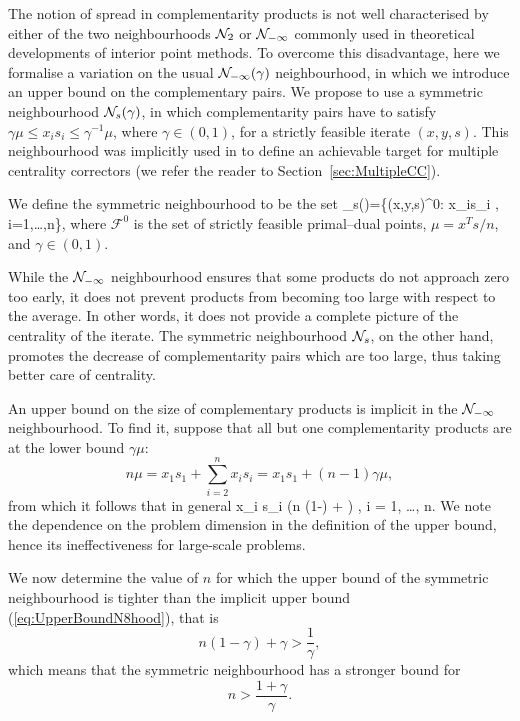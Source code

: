 The notion of spread in complementarity products
is not well characterised by either 
of the two neighbourhoods $\mathcal{N}_2$ or $\mathcal{N}_{-\infty}$ commonly used 
in theoretical developments of interior point methods.
To overcome this disadvantage, here we formalise a variation 
on the usual $\mathcal{N}_{-\infty}(\gamma)$ neighbourhood, 
in which we introduce an upper bound on the complementary pairs. 
We propose to use a symmetric neighbourhood $\mathcal{N}_s(\gamma)$,
in which complementarity pairs have to satisfy 
$\gamma \mu \leq x_i s_i \leq \gamma^{-1} \mu$, where $\gamma \in (0,1)$, 
for a strictly feasible iterate $(x,y,s)$.
This neighbourhood was implicitly used in \cite{Gondzio96}
to define an achievable target for multiple centrality correctors
(we refer the reader to Section~\ref{sec:MultipleCC}).


We define the symmetric neighbourhood to be the set
\be  \label{eq:SymmetricNeighbourhood}
  \Nhood_s(\gamma)=\{(x,y,s)\in {}^0: 
  \gamma\mu\le x_is_i \le {}\mu, \; i=1,\ldots,n\},
\ee
where $\mathcal{F}^0$ 
is the set of strictly feasible primal--dual points,
$\mu = x^Ts/n$, and $\gamma \in (0,1)$.

While the $\mathcal{N}_{-\infty}$ neighbourhood ensures that some 
products do not approach zero too early, it does not prevent products
from becoming too large with respect to the average.
In other words, it does not provide a complete 
picture of the centrality of the iterate. The symmetric 
neighbourhood $\mathcal{N}_s$, on the other hand, promotes 
the decrease of complementarity pairs which are too large, thus taking 
better care of centrality.

An upper bound on the size of complementary products
is implicit in the $\mathcal{N}_{-\infty}$ neighbourhood. To find it,
suppose that all but one complementarity products are at the lower bound
$\gamma\mu$:
\[
  n\mu = x_1s_1 + \sum_{i=2}^n x_is_i = x_1 s_1 + (n-1)\gamma\mu,
\]
from which it follows that in general
\be  \label{eq:UpperBoundN8hood}
  x_i s_i \le (n (1-\gamma) + \gamma) \mu, \quad i = 1, \ldots, n.
\ee
We note the dependence on the problem dimension in the definition of the
upper bound, hence its ineffectiveness for large-scale problems.

We now determine the value of $n$ for which the upper bound of
the symmetric neighbourhood is tighter than the implicit upper bound
(\ref{eq:UpperBoundN8hood}), that is
\[
  n(1-\gamma) + \gamma > \frac{1}{\gamma},
\]
which means that the symmetric neighbourhood has a stronger bound
for
\[
  n > \frac{1+\gamma}{\gamma}.
\]

